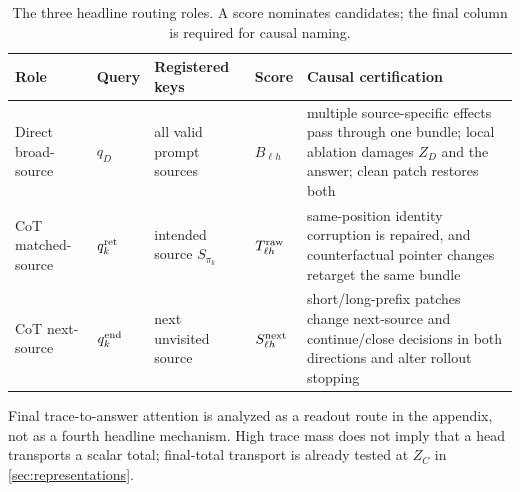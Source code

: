 \begin{table}[H]
\centering
\small
\caption{The three headline routing roles. A score nominates candidates; the final column is required for causal naming.}
\label{tab:head-roles}
\begin{tabularx}{\textwidth}{@{}P{.19\textwidth}P{.17\textwidth}P{.20\textwidth}P{.12\textwidth}Y@{}}
\toprule
Role & Query & Registered keys & Score & Causal certification \\
\midrule
Direct broad-source
  & \(q_D\)
  & all valid prompt sources
  & \(B_{\ell h}\)
  & multiple source-specific effects pass through one bundle; local ablation damages \(Z_D\) and the answer; clean patch restores both \\
CoT matched-source
  & \(q_k^{\rm ret}\)
  & intended source \(S_{\pi_k}\)
  & \(T_{\ell h}^{\rm raw}\)
  & same-position identity corruption is repaired, and counterfactual pointer changes retarget the same bundle \\
CoT next-source
  & \(q_k^{\rm end}\)
  & next unvisited source
  & \(S_{\ell h}^{\rm next}\)
  & short/long-prefix patches change next-source and continue/close decisions in both directions and alter rollout stopping \\
\bottomrule
\end{tabularx}
\end{table}

Final trace-to-answer attention is analyzed as a readout route in the appendix, not as a fourth headline mechanism. High trace mass does not imply that a head transports a scalar total; final-total transport is already tested at \(Z_C\) in \cref{sec:representations}.

